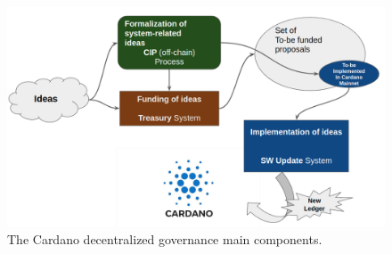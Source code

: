 \begin{figure}[h!] %
	\centering
	\includegraphics[width=0.8\columnwidth,
	keepaspectratio]{figures/cardano_dec_gov_components.png}
	\caption{The Cardano decentralized governance main components.}
	\label{fig:cardano_dec_gov_components}
\end{figure}

